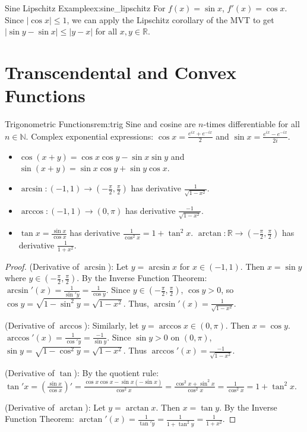 \documentclass[11pt, a4paper]{article}
\begin{document}
\begin{example}{Sine Lipschitz Example}{ex:sine_lipschitz}
For $f(x) = \sin x$, $f'(x) = \cos x$. Since $|\cos x| \le 1$, we can apply the Lipschitz corollary of the MVT to get $|\sin y - \sin x| \le |y - x|$ for all $x, y \in \mathbb{R}$.
\end{example}

\section{Transcendental and Convex Functions}

\begin{remark}{Trigonometric Functions}{rem:trig}
Sine and cosine are $n$-times differentiable for all $n \in \mathbb{N}$. Complex exponential expressions: $\cos x = \frac{e^{ix} + e^{-ix}}{2}$ and $\sin x = \frac{e^{ix} - e^{-ix}}{2i}$.
\begin{itemize}
    \item $\cos(x+y) = \cos x \cos y - \sin x \sin y$ and $\sin(x+y) = \sin x \cos y + \sin y \cos x$.
    \item $\arcsin: (-1, 1) \to (-\frac{\pi}{2}, \frac{\pi}{2})$ has derivative $\frac{1}{\sqrt{1-x^2}}$.
    \item $\arccos: (-1, 1) \to (0, \pi)$ has derivative $\frac{-1}{\sqrt{1-x^2}}$.
    \item $\tan x = \frac{\sin x}{\cos x}$ has derivative $\frac{1}{\cos^2 x} = 1 + \tan^2 x$. $\arctan: \mathbb{R} \to (-\frac{\pi}{2}, \frac{\pi}{2})$ has derivative $\frac{1}{1+x^2}$.
\end{itemize}
\end{remark}
\begin{proof}
(Derivative of $\arcsin$): Let $y = \arcsin x$ for $x \in (-1, 1)$. Then $x = \sin y$ where $y \in (-\frac{\pi}{2}, \frac{\pi}{2})$.
By the Inverse Function Theorem: $\arcsin'(x) = \frac{1}{\sin' y} = \frac{1}{\cos y}$.
Since $y \in (-\frac{\pi}{2}, \frac{\pi}{2})$, $\cos y > 0$, so $\cos y = \sqrt{1 - \sin^2 y} = \sqrt{1 - x^2}$. Thus, $\arcsin'(x) = \frac{1}{\sqrt{1 - x^2}}$.

(Derivative of $\arccos$): Similarly, let $y = \arccos x \in (0, \pi)$. Then $x = \cos y$.
$\arccos'(x) = \frac{1}{\cos' y} = \frac{-1}{\sin y}$. Since $\sin y > 0$ on $(0, \pi)$, $\sin y = \sqrt{1-\cos^2 y} = \sqrt{1-x^2}$. Thus $\arccos'(x) = \frac{-1}{\sqrt{1-x^2}}$.

(Derivative of $\tan$): By the quotient rule: 
$\tan' x = \left(\frac{\sin x}{\cos x}\right)' = \frac{\cos x \cos x - \sin x (-\sin x)}{\cos^2 x} = \frac{\cos^2 x + \sin^2 x}{\cos^2 x} = \frac{1}{\cos^2 x} = 1 + \tan^2 x$.

(Derivative of $\arctan$): Let $y = \arctan x$. Then $x = \tan y$.
By the Inverse Function Theorem: $\arctan'(x) = \frac{1}{\tan' y} = \frac{1}{1 + \tan^2 y} = \frac{1}{1 + x^2}$.
\end{proof}
\end{document}
